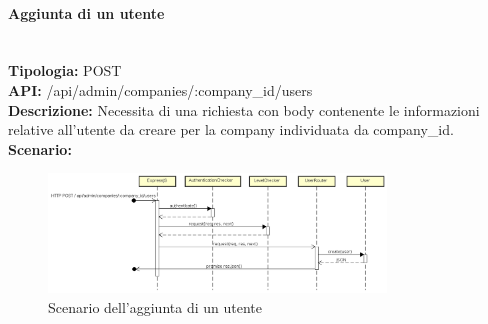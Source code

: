 \newpage
\paragraph{Aggiunta di un utente}\mbox{}\\
\textbf{Tipologia:} POST \\
\textbf{API:} /api/admin/companies/:company\_id/users \\
\textbf{Descrizione:} Necessita di una richiesta con body contenente le informazioni relative all'utente da creare per la company individuata da company\_id. \\
\textbf{Scenario:} 
\begin{figure}[H]
\centering
\includegraphics[width=0.8\textwidth]{res/sections/backend/sequence/(POST)userSA.png}
\caption{Scenario dell'aggiunta di un utente}
\end{figure}
